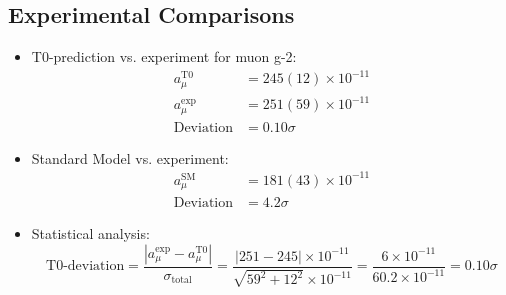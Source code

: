\documentclass[12pt,a4paper]{article}
\begin{document}
	\subsection{Experimental Comparisons}
\begin{itemize}
	\item T0-prediction vs. experiment for muon g-2:
	\begin{align}
		a_\mu^{\text{T0}} &= 245(12) \times 10^{-11} \\
		a_\mu^{\text{exp}} &= 251(59) \times 10^{-11} \\
		\text{Deviation} &= 0.10\sigma
	\end{align}
	
	\item Standard Model vs. experiment:
	\begin{align}
		a_\mu^{\text{SM}} &= 181(43) \times 10^{-11} \\
		\text{Deviation} &= 4.2\sigma
	\end{align}
	
	\item Statistical analysis:
	\begin{equation}
		\text{T0-deviation} = \frac{|a_\mu^{\text{exp}} - a_\mu^{\text{T0}}|}{\sigma_{\text{total}}} = \frac{|251 - 245| \times 10^{-11}}{\sqrt{59^2 + 12^2} \times 10^{-11}} = \frac{6 \times 10^{-11}}{60.2 \times 10^{-11}} = 0.10\sigma
	\end{equation}
\end{itemize}
\end{document}
